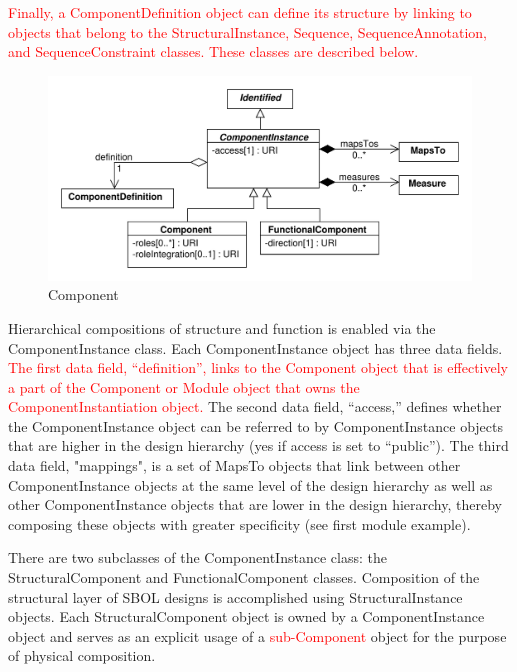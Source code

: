 \documentclass[draftspec]{sbmlpkgspec}
\begin{document}
\textcolor{red}{Finally, a ComponentDefinition object can define its structure by linking to objects that belong to the StructuralInstance, Sequence, SequenceAnnotation, and SequenceConstraint classes. These classes are described below.}

\begin{figure}[h]
\begin{center}
\includegraphics[width=\textwidth]{uml/component_instance}
\caption[]{Component}
\label{uml:component}
\end{center}
\end{figure}

Hierarchical compositions of structure and function is enabled via the ComponentInstance class. Each ComponentInstance object has three data fields. \textcolor{red}{The first data field, “definition”, links to the Component object that is effectively a part of the Component or Module object that owns the ComponentInstantiation object.} The second data field, “access,” defines whether the ComponentInstance object can be referred to by ComponentInstance objects that are higher in the design hierarchy (yes if access is set to “public”). The third data field, "mappings", is a set of MapsTo objects that link between other ComponentInstance objects at the same level of the design hierarchy as well as other ComponentInstance objects that are lower in the design hierarchy, thereby composing these objects with greater specificity (see first module example).

There are two subclasses of the ComponentInstance class: the StructuralComponent and FunctionalComponent classes. Composition of the structural layer of SBOL designs is accomplished using StructuralInstance objects. Each StructuralComponent object is owned by a ComponentInstance object and serves as an explicit usage of a \textcolor{red}{sub-Component} object for the purpose of physical composition.
\end{document}
